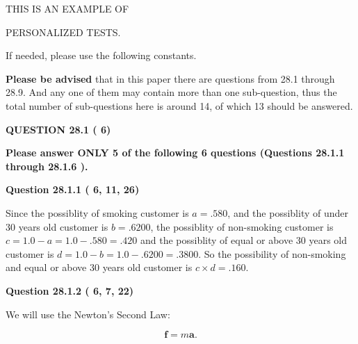 \documentclass[12pt]{article}
\begin{document}
   
   
   
 \vspace{0.2in}
 
 
{\Huge  THIS IS AN EXAMPLE OF}
 
{\Huge  PERSONALIZED TESTS. }
 
If needed, please use the following constants.
 
 
 
{\textbf{\large{Please be advised}}} that in this paper there are questions from
28.1 through
28.9.
And any one of them may contain more than one sub-question, thus the total number
of sub-questions here is around 14, of which
13 should be answered.
 
\vspace{0.3in}
 
 
   
   
  
\vspace{0.2in}
  
{\textbf{\Large{QUESTION
28.1 
 (          6)
}}}
  
  
{\textbf{\Large{Please answer ONLY  %
           5 %
 of the following  %
           6 %
 questions (Questions  %
28.1.1 %
 through  %
28.1.6 %
 ). }}}
   
   
  
\vspace{0.2in}
  
{\textbf{\Large{Question
28.1.1 
 (          6,         11,         26)
}}}
  
  
 
 

Since the possiblity of  %
smoking customer is $ a =  %
.580 $,
and the possiblity of  %
 under 30 years old customer is $ b =  %
.6200 $,
the possiblity of  %
non-smoking customer is $ c = 1.0 - a = 1.0 -
.580
=  %
.420 $ and the possiblity of  %
equal or above 30 years old
customer is $ d = 1.0 - b = 1.0 -  %
.6200 =  %
.3800  $.
So the possibility of  %
 non-smoking and  %
equal or above 30 years old
customer is $ c \times d =  %
.160 $.
 
 
 
  
\vspace{0.2in}
  
{\textbf{\Large{Question
28.1.2 
 (          6,          7,         22)
}}}
  
  
 
 

We will use the Newton's Second Law:
 
\[
\mathbf{f}=m\mathbf{a}.
\]
 
\end{document}
